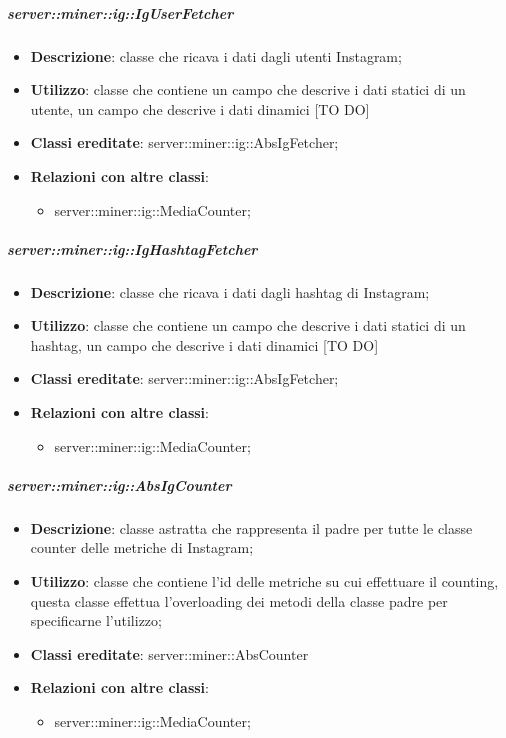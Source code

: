 	\subparagraph{server::miner::ig::IgUserFetcher} %
		\label{subp:server_miner_ig_IgUserFetcher}
			\begin{itemize}
				\item \textbf{Descrizione}: classe che ricava i dati dagli utenti Instagram;
				\item \textbf{Utilizzo}: classe che contiene un campo che descrive i dati statici di un utente, un campo che descrive i dati dinamici [TO DO]
				\item \textbf{Classi ereditate}: server::miner::ig::AbsIgFetcher;				
				\item \textbf{Relazioni con altre classi}:
					\begin{itemize}
						\item server::miner::ig::MediaCounter;
					\end{itemize}
			\end{itemize}
		
	\subparagraph{server::miner::ig::IgHashtagFetcher} %
		\label{subp:server_miner_ig_IgHashtagFetcher}
			\begin{itemize}
				\item \textbf{Descrizione}: classe che ricava i dati dagli hashtag di Instagram;
				\item \textbf{Utilizzo}: classe che contiene un campo che descrive i dati statici di un hashtag, un campo che descrive i dati dinamici [TO DO]
				\item \textbf{Classi ereditate}: server::miner::ig::AbsIgFetcher;				
				\item \textbf{Relazioni con altre classi}:
					\begin{itemize}
						\item server::miner::ig::MediaCounter;
					\end{itemize}
			\end{itemize}
		
	\subparagraph{server::miner::ig::AbsIgCounter} %
		\label{subp:server_miner_ig_AbsIgCounter}
			\begin{itemize}
				\item \textbf{Descrizione}: classe astratta che rappresenta il padre per tutte le classe counter delle metriche di Instagram;
				\item \textbf{Utilizzo}: classe che contiene l’id delle metriche su cui effettuare il counting, questa classe effettua l’overloading dei metodi della classe padre per specificarne l’utilizzo;
				\item \textbf{Classi ereditate}: server::miner::AbsCounter
				\item \textbf{Relazioni con altre classi}:
					\begin{itemize}
						\item server::miner::ig::MediaCounter;
					\end{itemize}
			\end{itemize}
		
